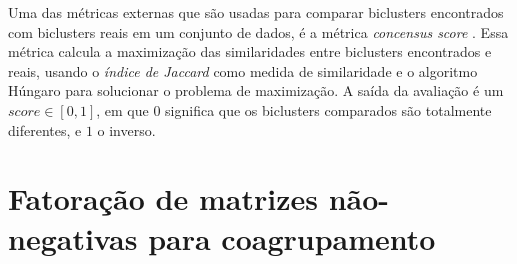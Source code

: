 \documentclass[
    12pt,                %
    oneside,            %
    a4paper,            %
    english,            %
    brazil                %
    ]{abntex2ppgsi}
\begin{document}
Uma das métricas externas que são usadas para comparar biclusters encontrados com biclusters reais em um conjunto de dados, é a métrica \textit{concensus score} \cite{Hochreiter2010}. Essa métrica calcula a maximização das similaridades entre biclusters encontrados e reais, usando o \textit{índice de Jaccard} como medida de similaridade e o algoritmo Húngaro para solucionar o problema de maximização. A saída da avaliação é um $\textit{score} \in [0,1]$, em que $0$ significa que os biclusters comparados são totalmente diferentes, e $1$ o inverso.


\chapter{Fatoração de matrizes não-negativas para coagrupamento}
\label{ch:fatoracao}


\end{document}
